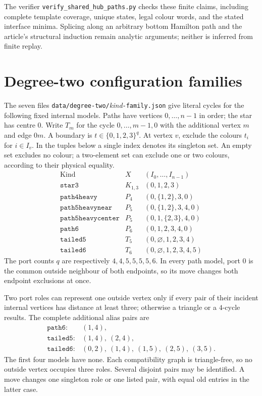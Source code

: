 \documentclass[11pt]{article}
\numberwithin{equation}{section}
\numberwithin{table}{section}
\begin{document}
The verifier \texttt{verify\_shared\_hub\_paths.py} checks these finite
claims, including complete template coverage, unique states, legal colour
words, and the stated interface minima.
Splicing along an
arbitrary bottom Hamilton path and the article's structural induction
remain analytic arguments; neither is inferred from finite replay.

\clearpage
\section{Degree-two configuration families}
\label{app:degree-two-family-certificates}
The seven files \texttt{data/degree-two/}\emph{kind}\texttt{-family.json}
give literal cycles for the following fixed internal models. Paths have
vertices $0,\ldots,n-1$ in order; the star has centre $0$.
Write $T_m$ for the cycle $0,\ldots,m-1,0$ with the additional vertex
$m$ and edge $0m$. A boundary is $t\in\{0,1,2,3\}^q$.
At vertex $v$, exclude the colours $t_i$ for $i\in I_v$.
In the tuples below a single index denotes its singleton set.
An empty set excludes no colour; a two-element set can exclude one
or two colours, according to their physical equality.
\[
\begin{array}{lcl}
\text{Kind}&X&(I_0,\ldots,I_{n-1})\\ \hline
\mathtt{star3}&K_{1,3}&(0,1,2,3)\\
\mathtt{path4heavy}&P_4&(0,\{1,2\},3,0)\\
\mathtt{path5heavynear}&P_5&(0,\{1,2\},3,4,0)\\
\mathtt{path5heavycenter}&P_5&(0,1,\{2,3\},4,0)\\
\mathtt{path6}&P_6&(0,1,2,3,4,0)\\
\mathtt{tailed5}&T_5&(0,\varnothing,1,2,3,4)\\
\mathtt{tailed6}&T_6&(0,\varnothing,1,2,3,4,5)
\end{array}
\]
The port counts $q$ are respectively $4,4,5,5,5,5,6$.
In every path model, port $0$ is the common outside neighbour of both
endpoints, so its move changes both endpoint exclusions at once.

Two port roles can represent one outside vertex only if every pair
of their incident internal vertices has distance at least three;
otherwise a triangle or a $4$-cycle results. The complete additional
alias pairs are
\[
\begin{array}{ll}
\mathtt{path6}:&(1,4),\\
\mathtt{tailed5}:&(1,4),\ (2,4),\\
\mathtt{tailed6}:&(0,2),\ (1,4),\ (1,5),\ (2,5),\ (3,5).
\end{array}
\]
The first four models have none. Each compatibility graph is
triangle-free, so no outside vertex occupies three roles. Several
disjoint pairs may be identified. A move changes one singleton role
or one listed pair, with equal old entries in the latter case.
\end{document}
